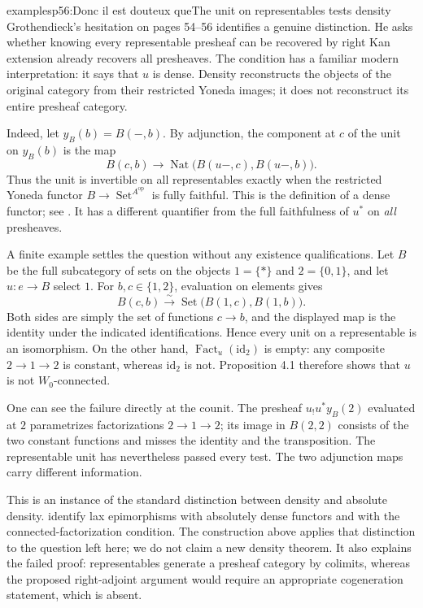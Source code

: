 \begin{dcomment}{examples}{p56:Donc il est douteux que}{The unit on representables tests density}
Grothendieck's hesitation on pages 54--56 identifies a genuine distinction. He asks whether knowing every representable presheaf can be recovered by right Kan extension already recovers all presheaves. The condition has a familiar modern interpretation: it says that $u$ is dense. Density reconstructs the objects of the original category from their restricted Yoneda images; it does not reconstruct its entire presheaf category.

Indeed, let $y_B(b)=B(-,b)$. By adjunction, the component at $c$ of the unit on $y_B(b)$ is the map
\[
 B(c,b)\longrightarrow
 \operatorname{Nat}\bigl(B(u-,c),B(u-,b)\bigr).
\]
Thus the unit is invertible on all representables exactly when the restricted Yoneda functor $B\to\operatorname{Set}^{A^{\mathrm{op}}}$ is fully faithful. This is the definition of a dense functor; see \citet[Definition 6.5.11]{Riehl2016}. It has a different quantifier from the full faithfulness of $u^*$ on \emph{all} presheaves.

A finite example settles the question without any existence qualifications. Let $B$ be the full subcategory of sets on the objects $1=\{*\}$ and $2=\{0,1\}$, and let $u:e\to B$ select $1$. For $b,c\in\{1,2\}$, evaluation on elements gives
\[
 B(c,b)\xrightarrow{\sim}
 \operatorname{Set}\bigl(B(1,c),B(1,b)\bigr).
\]
Both sides are simply the set of functions $c\to b$, and the displayed map is the identity under the indicated identifications. Hence every unit on a representable is an isomorphism. On the other hand, $\operatorname{Fact}_u(\mathrm{id}_2)$ is empty: any composite $2\to1\to2$ is constant, whereas $\mathrm{id}_2$ is not. Proposition 4.1 therefore shows that $u$ is not $W_0$-connected.

One can see the failure directly at the counit. The presheaf $u_!u^*y_B(2)$ evaluated at $2$ parametrizes factorizations $2\to1\to2$; its image in $B(2,2)$ consists of the two constant functions and misses the identity and the transposition. The representable unit has nevertheless passed every test. The two adjunction maps carry different information.

This is an instance of the standard distinction between density and absolute density. \citet{AdamekElBashirSobralVelebil2001} identify lax epimorphisms with absolutely dense functors and with the connected-factorization condition. The construction above applies that distinction to the question left here; we do not claim a new density theorem. It also explains the failed proof: representables generate a presheaf category by colimits, whereas the proposed right-adjoint argument would require an appropriate cogeneration statement, which is absent.
\end{dcomment}

